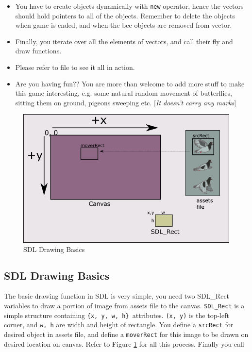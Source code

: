 \documentclass[a4paper,12pt]{article}
\begin{document}
\begin{itemize}
	 	\item You have to create objects dynamically with \texttt{new} operator, hence the vectors should hold pointers to all of the objects. Remember to delete the objects when game is ended, and when the bee objects are removed from vector.
	 	
	 	\item Finally, you iterate over all the elements of vectors, and call their fly and draw functions.
	 	
	 	\item Please refer to  file to see it all in action.
	 	
	 	\item Are you having fun?? You are more than welcome to add more stuff to make this game interesting, e.g. some natural random movement of butterflies, sitting them on ground, pigeons sweeping etc. [\textit{It doesn't carry any marks}]
	 \end{itemize}
 

	\begin{figure}
		\includegraphics[width=\linewidth]{sdlDrawing}
		\caption{SDL Drawing Basics}
		\label{fig:sdlDrawing}
	\end{figure}  

	
	
	\subsection{SDL Drawing Basics}
	
	The basic drawing function in SDL is very simple, you need two SDL\_Rect variables to draw a portion of image from assets file to the canvas. \texttt{SDL\_Rect} is a simple structure containing \texttt{\{x, y, w, h\} }attributes. \texttt{(x, y)} is the top-left corner, and \texttt{w, h} are width and height of rectangle. You define a \texttt{srcRect} for desired object in assets file, and define a \texttt{moverRect} for this image to be drawn on desired location on canvas. Refer to Figure \ref{fig:sdlDrawing} for all this process.  Finally you call 
	
\end{document}
